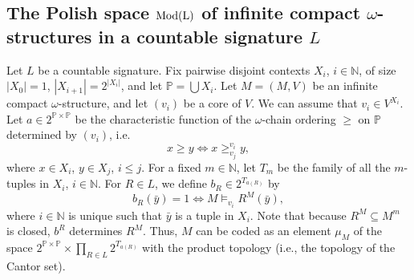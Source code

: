 \documentclass[12pt]{amsart}
\theoremstyle{plain}
\newcommand \Mod{\rm{Mod}}
\newcommand \NN{\mathbb{N}}
\newcommand \PPb{\mathbb{P}}
\begin{document}
	
		
	\subsection{The Polish space $\Mod(L)$ of infinite compact $\omega$-structures in a countable signature $L$}
	
	Let $L$ be  a countable signature. Fix pairwise disjoint contexts $X_i$, $i \in \NN$, of size $|X_0|=1$, $|X_{i+1}|=2^{|X_i|}$, and let $\PPb=\bigcup X_i$. Let $M=(M,V)$ be an infinite compact $\omega$-structure, and let $(v_i)$ be a core of $V$. We can assume that $v_i \in V^{X_i}$. Let $a \in 2^{\PPb \times \PPb}$ be the characteristic function of the $\omega$-chain ordering $\geq$ on $\PPb$ determined by $(v_i)$, i.e. $$x \geq y \iff x \geq^{v_i}_{v_j} y,$$ where $x \in X_i$, $y \in X_j$, $i \leq j$.  For a fixed $m \in \NN$, let $T_m$ be the family of all the $m$-tuples in $X_i$, $i \in \NN$. For $R \in L$, we define $b_R \in 2^{T_{a(R)}}$ by
	$$b_R(\bar{y})=1 \iff M \models_{v_i} R^M(\bar{y}),$$
	where $i \in \NN$ is unique such that $\bar{y}$ is a tuple in $X_i$. Note that because $R^M \subseteq M^m$ is closed, $b^R$ determines $R^M$. Thus, $M$ can be coded as an element $\mu_M$ of the space $2^{\PPb \times \PPb} \times \prod_{R \in L}2^{T_{a(R)}}$ with the product topology (i.e., the topology of the Cantor set).
	
\end{document}
